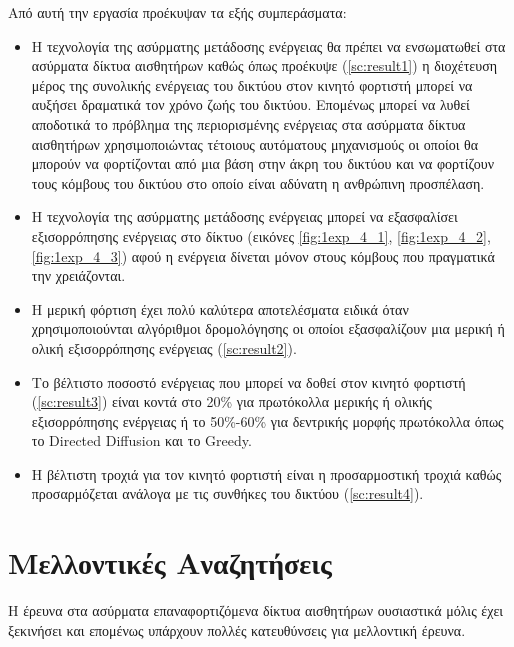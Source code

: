 Από αυτή την εργασία προέκυψαν τα εξής συμπεράσματα:
\begin{itemize}
\item Η τεχνολογία της ασύρματης μετάδοσης ενέργειας θα πρέπει να ενσωματωθεί στα ασύρματα δίκτυα αισθητήρων καθώς όπως προέκυψε (\ref{sc:result1}) η διοχέτευση
μέρος της συνολικής ενέργειας του δικτύου στον κινητό φορτιστή μπορεί να αυξήσει δραματικά τον χρόνο ζωής του δικτύου. Επομένως μπορεί να λυθεί αποδοτικά το πρόβλημα
της περιορισμένης ενέργειας στα ασύρματα δίκτυα αισθητήρων χρησιμοποιώντας τέτοιους αυτόματους μηχανισμούς οι οποίοι θα μπορούν να φορτίζονται από μια βάση στην άκρη
του δικτύου και να φορτίζουν τους κόμβους του δικτύου στο οποίο είναι αδύνατη η ανθρώπινη προσπέλαση.
\item Η τεχνολογία της ασύρματης μετάδοσης ενέργειας μπορεί να εξασφαλίσει εξισορρόπησης ενέργειας στο δίκτυο (εικόνες \ref{fig:1exp_4_1}, \ref{fig:1exp_4_2},
\ref{fig:1exp_4_3}) αφού η ενέργεια δίνεται μόνον στους κόμβους που πραγματικά την χρειάζονται.
\item Η μερική φόρτιση έχει πολύ καλύτερα αποτελέσματα ειδικά όταν χρησιμοποιούνται αλγόριθμοι δρομολόγησης οι οποίοι εξασφαλίζουν μια μερική ή ολική εξισορρόπησης
ενέργειας (\ref{sc:result2}).
\item Το βέλτιστο ποσοστό ενέργειας που μπορεί να δοθεί στον κινητό φορτιστή (\ref{sc:result3}) είναι κοντά στο 20\% για πρωτόκολλα μερικής ή ολικής εξισορρόπησης
ενέργειας ή το 50\%-60\% για δεντρικής μορφής πρωτόκολλα όπως το Directed Diffusion \cite{directed_diffusion} και το Greedy\cite{greedy_protocol}.
\item H βέλτιστη τροχιά για τον κινητό φορτιστή είναι η προσαρμοστική τροχιά καθώς προσαρμόζεται ανάλογα με τις συνθήκες του δικτύου (\ref{sc:result4}).
\end{itemize}

\section{Μελλοντικές Αναζητήσεις}
Η έρευνα στα ασύρματα επαναφορτιζόμενα δίκτυα αισθητήρων ουσιαστικά μόλις έχει ξεκινήσει και επομένως υπάρχουν πολλές κατευθύνσεις για μελλοντική έρευνα.

